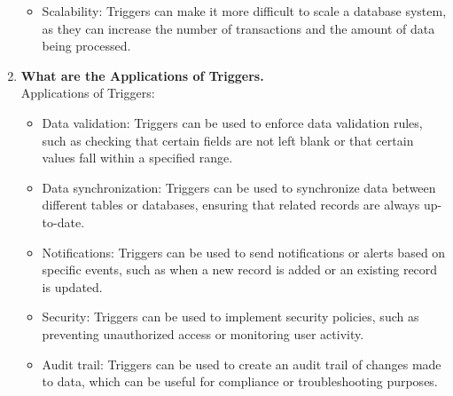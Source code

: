 \documentclass[11pt]{article}
\begin{document}
\begin{enumerate}
\begin{itemize}
              \item Scalability: Triggers can make it more difficult to scale a database system, as they can increase the number of transactions and the amount of data being processed.
          \end{itemize}
    \item \textbf{What are the Applications of Triggers.}\\

        Applications of Triggers:
          \begin{itemize}
              \item Data validation: Triggers can be used to enforce data validation rules, such as checking that certain fields are not left blank or that certain values fall within a specified range.

              \item Data synchronization: Triggers can be used to synchronize data between different tables or databases, ensuring that related records are always up-to-date.

              \item Notifications: Triggers can be used to send notifications or alerts based on specific events, such as when a new record is added or an existing record is updated.

              \item Security: Triggers can be used to implement security policies, such as preventing unauthorized access or monitoring user activity.

              \item Audit trail: Triggers can be used to create an audit trail of changes made to data, which can be useful for compliance or troubleshooting purposes.
          \end{itemize}
\end{enumerate}
\end{document}
